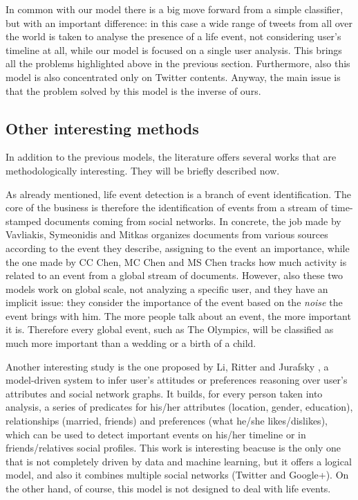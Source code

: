 In common with our model there is a big move forward from a simple classifier, but with an important difference: in this case a wide range of tweets from all over the world is taken to analyse the presence of a life event, not considering user's timeline at all, while our model is focused on a single user analysis. This brings all the problems highlighted above in the previous section. Furthermore, also this model is also concentrated only on Twitter contents. Anyway, the main issue is that the problem solved by this model is the inverse of ours.

\subsection{Other interesting methods}
In addition to the previous models, the literature offers several works that are methodologically interesting. They will be briefly described now.

As already mentioned, life event detection is a branch of event identification. The core of the business is therefore the identification of events from a stream of time-stamped documents coming from social networks. In concrete, the job made by Vavliakis, Symeonidis and Mitkas \cite{vavliakis2013event} organizes documents from various sources according to the event they describe, assigning to the event an importance, while the one made by CC Chen, MC Chen and MS Chen \cite{chen2009adaptive} tracks how much activity is related to an event from a global stream of documents. However, also these two models work on global scale, not analyzing a specific user, and they have an implicit issue: they consider the importance of the event based on the \textit{noise} the event brings with him. The more people talk about an event, the more important it is. Therefore every global event, such as The Olympics, will be classified as much more important than a wedding or a birth of a child.

Another interesting study is the one proposed by Li, Ritter and Jurafsky \cite{li2014inferring}, a model-driven system to infer user's attitudes or preferences reasoning over user's attributes and social network graphs. It builds, for every person taken into analysis, a series of predicates for his/her attributes (location, gender, education), relationships (married, friends) and preferences (what he/she likes/dislikes), which can be used to detect important events on his/her timeline or in friends/relatives social profiles. This work is interesting beacuse is the only one that is not completely driven by data and machine learning, but it offers a logical model, and also it combines multiple social networks (Twitter and Google+). On the other hand, of course, this model is not designed to deal with life events.

